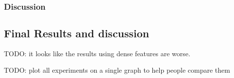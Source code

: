 \subsubsection{Discussion}

\subsection{Final Results and discussion}

{\color{red} TODO: it looks like the results using dense features are worse.}

{\color{red} TODO: plot all experiments on a single graph to help people compare them}